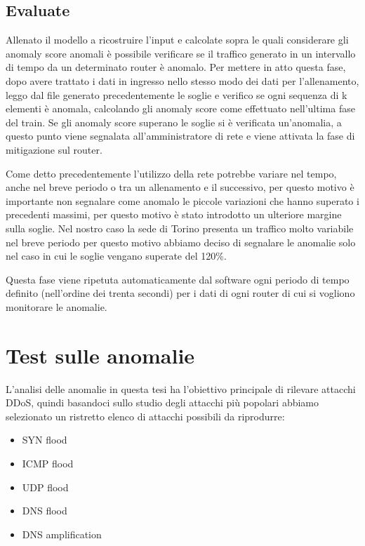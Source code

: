 \subsection{Evaluate}
Allenato il modello a ricostruire l'input e calcolate sopra le quali considerare gli anomaly score anomali è possibile verificare se il traffico generato in un intervallo di tempo da un determinato router è anomalo.  
Per mettere in atto questa fase, dopo avere trattato i dati in ingresso nello stesso modo dei dati per l'allenamento, leggo dal file generato precedentemente le soglie e verifico se ogni sequenza di k elementi è anomala, calcolando gli anomaly score come effettuato nell'ultima fase del train. Se gli anomaly score superano le soglie si è verificata un'anomalia, a questo punto viene segnalata all'amministratore di rete e viene attivata la fase di mitigazione sul router.

Come detto precedentemente l'utilizzo della rete potrebbe variare nel tempo, anche nel breve periodo o tra un allenamento e il successivo, per questo motivo è importante non segnalare come anomalo le piccole variazioni che hanno superato i precedenti massimi, per questo motivo è stato introdotto un ulteriore margine sulla soglie. Nel nostro caso la sede di Torino presenta un traffico molto variabile nel breve periodo per questo motivo abbiamo deciso di segnalare le anomalie solo nel caso in cui le soglie vengano superate del 120\%.

Questa fase viene ripetuta automaticamente dal software ogni periodo di tempo definito (nell'ordine dei trenta secondi) per i dati di ogni router di cui si vogliono monitorare le anomalie.


\section{Test sulle anomalie}

L'analisi delle anomalie in questa tesi ha l'obiettivo principale di rilevare attacchi DDoS, quindi basandoci sullo studio degli attacchi più popolari abbiamo selezionato un ristretto elenco di attacchi possibili da riprodurre:
\begin{itemize}
    \item SYN flood
    \item ICMP flood
    \item UDP flood
    \item DNS flood
    \item DNS amplification
\end{itemize}

